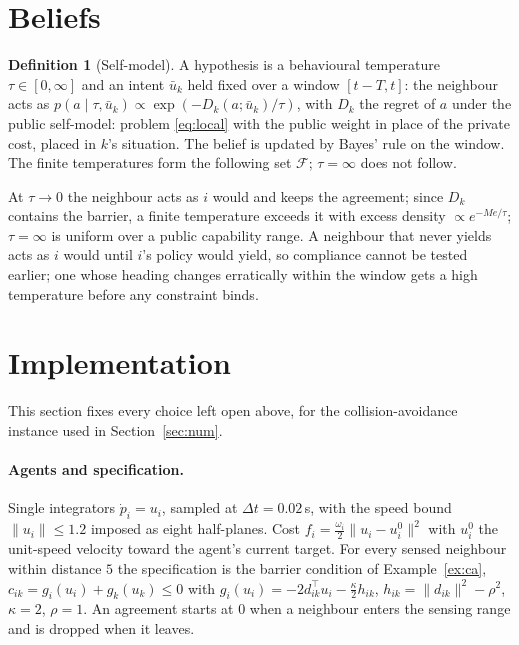 \documentclass[11pt]{article}
\theoremstyle{definition}
\newtheorem{definition}[theorem]{Definition}
\theoremstyle{remark}
\newcommand{\F}{\mathcal{F}}
\begin{document}
\section{Beliefs}
\begin{definition}[Self-model]
A hypothesis is a behavioural temperature $\tau\in[0,\infty]$ and an intent $\bar u_k$ held fixed over a window $[t-T,t]$: the neighbour acts as $p(a\mid\tau,\bar u_k)\propto\exp(-D_k(a;\bar u_k)/\tau)$, with $D_k$ the regret of $a$ under the public self-model: problem \eqref{eq:local} with the public weight in place of the private cost, placed in $k$'s situation. The belief is updated by Bayes' rule on the window. The finite temperatures form the following set $\F$; $\tau=\infty$ does not follow.
\end{definition}

At $\tau\to0$ the neighbour acts as $i$ would and keeps the agreement; since $D_k$ contains the barrier, a finite temperature exceeds it with excess density $\propto e^{-Me/\tau}$; $\tau=\infty$ is uniform over a public capability range. A neighbour that never yields acts as $i$ would until $i$'s policy would yield, so compliance cannot be tested earlier; one whose heading changes erratically within the window gets a high temperature before any constraint binds.

\section{Implementation}\label{sec:impl}
This section fixes every choice left open above, for the collision-avoidance instance used in Section~\ref{sec:num}.

\paragraph{Agents and specification.} Single integrators $\dot p_i=u_i$, sampled at $\Delta t=0.02$\,s, with the speed bound $\|u_i\|\le1.2$ imposed as eight half-planes. Cost $f_i=\frac{\omega_i}2\|u_i-u_i^0\|^2$ with $u_i^0$ the unit-speed velocity toward the agent's current target. For every sensed neighbour within distance $5$ the specification is the barrier condition of Example~\ref{ex:ca}, $c_{ik}=g_i(u_i)+g_k(u_k)\le0$ with $g_i(u_i)=-2d_{ik}^\top u_i-\frac\kappa2h_{ik}$, $h_{ik}=\|d_{ik}\|^2-\rho^2$, $\kappa=2$, $\rho=1$. An agreement starts at $0$ when a neighbour enters the sensing range and is dropped when it leaves.
\end{document}
